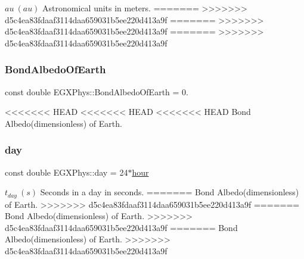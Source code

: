 $au\ (au)$ Astronomical units in meters. \mbox{\label{namespace_e_g_x_phys_a932fff28fce4321fdbf9abc5c1783dc9}} 
=======
\mbox{\label{namespace_e_g_x_phys_a932fff28fce4321fdbf9abc5c1783dc9}} 
>>>>>>> d5c4ea83fdaaf3114daa659031b5ee220d413a9f
=======
\mbox{\label{namespace_e_g_x_phys_a932fff28fce4321fdbf9abc5c1783dc9}} 
>>>>>>> d5c4ea83fdaaf3114daa659031b5ee220d413a9f
=======
\mbox{\label{namespace_e_g_x_phys_a932fff28fce4321fdbf9abc5c1783dc9}} 
>>>>>>> d5c4ea83fdaaf3114daa659031b5ee220d413a9f
\subsubsection{\texorpdfstring{Bond\+Albedo\+Of\+Earth}{BondAlbedoOfEarth}}
{\footnotesize\ttfamily const double E\+G\+X\+Phys\+::\+Bond\+Albedo\+Of\+Earth = 0.}

<<<<<<< HEAD
<<<<<<< HEAD
<<<<<<< HEAD
Bond Albedo(dimensionless) of Earth. \mbox{\label{namespace_e_g_x_phys_a24d985ae6f6cefe7e25ac40806b88f79}} 
\subsubsection{\texorpdfstring{day}{day}}
{\footnotesize\ttfamily const double E\+G\+X\+Phys\+::day = 24$\ast$\hyperlink{namespace_e_g_x_phys_a85c64ea70cddbb7e4c96adcc01cef6e2}{hour}}

$t_{day}\ (s)$ Seconds in a day in seconds. \mbox{\label{namespace_e_g_x_phys_a2a671e37351b9b7e334385a26a7f7102}} 
=======
Bond Albedo(dimensionless) of Earth. \mbox{\label{namespace_e_g_x_phys_a2a671e37351b9b7e334385a26a7f7102}} 
>>>>>>> d5c4ea83fdaaf3114daa659031b5ee220d413a9f
=======
Bond Albedo(dimensionless) of Earth. \mbox{\label{namespace_e_g_x_phys_a2a671e37351b9b7e334385a26a7f7102}} 
>>>>>>> d5c4ea83fdaaf3114daa659031b5ee220d413a9f
=======
Bond Albedo(dimensionless) of Earth. \mbox{\label{namespace_e_g_x_phys_a2a671e37351b9b7e334385a26a7f7102}} 
>>>>>>> d5c4ea83fdaaf3114daa659031b5ee220d413a9f
